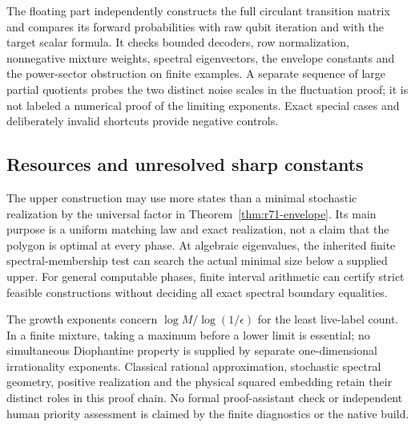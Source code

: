The floating part independently constructs the full circulant transition matrix and compares its forward probabilities with raw qubit iteration and with the target scalar formula. It checks bounded decoders, row normalization, nonnegative mixture weights, spectral eigenvectors, the envelope constants and the power-sector obstruction on finite examples. A separate sequence of large partial quotients probes the two distinct noise scales in the fluctuation proof; it is not labeled a numerical proof of the limiting exponents. Exact special cases and deliberately invalid shortcuts provide negative controls.

\subsection{Resources and unresolved sharp constants}
The upper construction may use more states than a minimal stochastic realization by the universal factor in Theorem~\ref{thm:r71-envelope}. Its main purpose is a uniform matching law and exact realization, not a claim that the polygon is optimal at every phase. At algebraic eigenvalues, the inherited finite spectral-membership test can search the actual minimal size below a supplied upper. For general computable phases, finite interval arithmetic can certify strict feasible constructions without deciding all exact spectral boundary equalities.

The growth exponents concern $\log M/\log(1/\epsilon)$ for the least live-label count. In a finite mixture, taking a maximum before a lower limit is essential; no simultaneous Diophantine property is supplied by separate one-dimensional irrationality exponents. Classical rational approximation, stochastic spectral geometry, positive realization and the physical squared embedding retain their distinct roles in this proof chain. No formal proof-assistant check or independent human priority assessment is claimed by the finite diagnostics or the native build.
